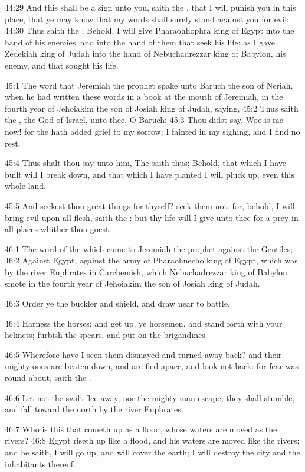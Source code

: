 44:29 And this shall be a sign unto you, saith the \LORD, that I will
punish you in this place, that ye may know that my words shall surely
stand against you for evil: 44:30 Thus saith the \LORD; Behold, I will
give Pharaohhophra king of Egypt into the hand of his enemies, and
into the hand of them that seek his life; as I gave Zedekiah king of
Judah into the hand of Nebuchadrezzar king of Babylon, his enemy, and
that sought his life.

45:1 The word that Jeremiah the prophet spake unto Baruch the son of
Neriah, when he had written these words in a book at the mouth of
Jeremiah, in the fourth year of Jehoiakim the son of Josiah king of
Judah, saying, 45:2 Thus saith the \LORD, the God of Israel, unto thee,
O Baruch: 45:3 Thou didst say, Woe is me now! for the \LORD hath added
grief to my sorrow; I fainted in my sighing, and I find no rest.

45:4 Thus shalt thou say unto him, The \LORD saith thus; Behold, that
which I have built will I break down, and that which I have planted I
will pluck up, even this whole land.

45:5 And seekest thou great things for thyself? seek them not: for,
behold, I will bring evil upon all flesh, saith the \LORD: but thy life
will I give unto thee for a prey in all places whither thou goest.

46:1 The word of the \LORD which came to Jeremiah the prophet against
the Gentiles; 46:2 Against Egypt, against the army of Pharaohnecho
king of Egypt, which was by the river Euphrates in Carchemish, which
Nebuchadrezzar king of Babylon smote in the fourth year of Jehoiakim
the son of Josiah king of Judah.

46:3 Order ye the buckler and shield, and draw near to battle.

46:4 Harness the horses; and get up, ye horsemen, and stand forth with
your helmets; furbish the spears, and put on the brigandines.

46:5 Wherefore have I seen them dismayed and turned away back? and
their mighty ones are beaten down, and are fled apace, and look not
back: for fear was round about, saith the \LORD.

46:6 Let not the swift flee away, nor the mighty man escape; they
shall stumble, and fall toward the north by the river Euphrates.

46:7 Who is this that cometh up as a flood, whose waters are moved as
the rivers?  46:8 Egypt riseth up like a flood, and his waters are
moved like the rivers; and he saith, I will go up, and will cover the
earth; I will destroy the city and the inhabitants thereof.

